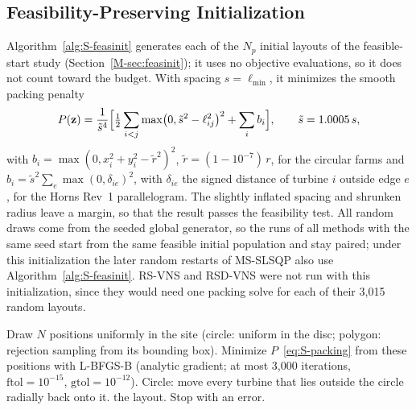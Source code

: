 \documentclass[10pt]{article}
\begin{document}
\subsection{Feasibility-Preserving Initialization}
\label{sec:S-feasinit-impl}
Algorithm~\ref{alg:S-feasinit} generates each of the $N_p$ initial layouts of the feasible-start study (Section~\ref{M-sec:feasinit}); it uses no objective evaluations, so it does not count toward the budget. With spacing $s=\ell_{\min}$, it minimizes the smooth packing penalty
\begin{equation}
P(\mathbf z)=\frac{1}{\tilde s^{4}}\Bigl[\tfrac12\sum_{i<j}\max\bigl(0,\tilde s^2-\ell_{ij}^2\bigr)^2+\sum_{i}b_i\Bigr],\qquad \tilde s=1.0005\,s,
\label{eq:S-packing}
\end{equation}
with $b_i=\max(0,x_i^2+y_i^2-\tilde r^2)^2$, $\tilde r=(1-10^{-7})\,r$, for the circular farms and $b_i=\tilde s^2\sum_e\max(0,\delta_{ie})^2$, with $\delta_{ie}$ the signed distance of turbine $i$ outside edge $e$, for the Horns Rev~1 parallelogram. The slightly inflated spacing and shrunken radius leave a margin, so that the result passes the feasibility test. All random draws come from the seeded global generator, so the runs of all methods with the same seed start from the same feasible initial population and stay paired; under this initialization the later random restarts of MS-SLSQP also use Algorithm~\ref{alg:S-feasinit}. RS-VNS and RSD-VNS were not run with this initialization, since they would need one packing solve for each of their 3,015 random layouts.
\begin{algorithm}[!htb]
\caption{Feasibility-preserving initialization of one layout ($N$ turbines, spacing $s$, circle of radius $r$ or convex polygon)}
\label{alg:S-feasinit}
\begin{algorithmic}[1]
    \State Draw $N$ positions uniformly in the site (circle: uniform in the disc; polygon: rejection sampling from its bounding box).
    \State Minimize $P$~\eqref{eq:S-packing} from these positions with L-BFGS-B (analytic gradient; at most 3,000 iterations, $\mathrm{ftol}=10^{-15}$, $\mathrm{gtol}=10^{-12}$).
    \State Circle: move every turbine that lies outside the circle radially back onto it.
        \State \Return the layout.
    \EndIf
\EndFor
\State Stop with an error.
\end{algorithmic}
\end{algorithm}
\end{document}
